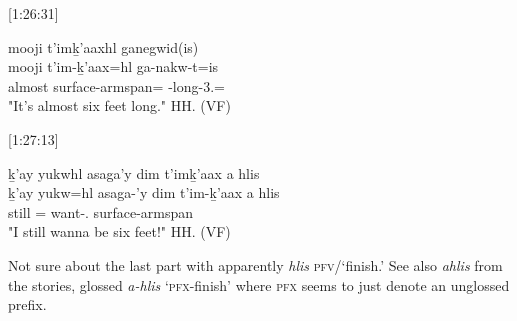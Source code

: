 [1:26:31]
\begin{exe}
    \ex \glll
    mooji t’imḵ’aaxhl ganegwid(is) \\
    mooji t’im-ḵ’aax=hl ga-nakw-t=is \\
    almost surface-armspan=\Cn{} \Distr-long-3.\Ii=\Qudd \\
    \glt "It's almost six feet long." \hfill HH.\ElicitationDate{} (VF)
\end{exe}

[1:27:13]
\begin{exe}
    \ex \glll
    ḵ'ay yukwhl asaga'y dim t’imḵ’aax a hlis \\
    ḵ'ay yukw=hl asaga-'y dim t’im-ḵ’aax a hlis \\
    still \Prog=\Cn{} want-\Fsg.\Ii{} \Prosp{} surface-armspan \Prep{} \Pfv \\
    \glt "I still wanna be six feet!" \hfill HH.\ElicitationDate{} (VF)
\end{exe}

Not sure about the last part with apparently \textit{hlis} \textsc{pfv}/`finish.' See also \textit{ahlis} from the stories, glossed \textit{a-hlis} `\textsc{pfx}-finish' where \textsc{pfx} seems to just denote an unglossed prefix.